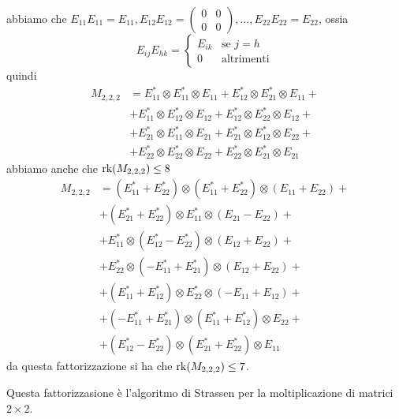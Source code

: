 \documentclass[../main.tex]{subfiles}
\begin{document}
abbiamo che $E_{11}E_{11} = E_{11}, E_{12}E_{12} = \begin{pmatrix}
        0 & 0 \\
        0 & 0
    \end{pmatrix}, \ldots, E_{22}E_{22} = E_{22}$, ossia
\begin{equation*}
    E_{ij} E_{hk} = \begin{cases}
        E_{ik} & \text{se } j = h  \\
        0      & \text{altrimenti}
    \end{cases}
\end{equation*}
quindi
\begin{align*}
    M_{2,2,2} & = E_{11}^* \otimes E_{11}^* \otimes E_{11} + E_{12}^* \otimes E_{21}^* \otimes E_{11} + \\
              & + E_{11}^* \otimes E_{12}^* \otimes E_{12} + E_{12}^* \otimes E_{22}^* \otimes E_{12} + \\
              & + E_{21}^* \otimes E_{11}^* \otimes E_{21} + E_{21}^* \otimes E_{12}^* \otimes E_{22} + \\
              & + E_{22}^* \otimes E_{22}^* \otimes E_{22} + E_{22}^* \otimes E_{21}^* \otimes E_{21}
\end{align*}
abbiamo anche che $\operatorname{rk}(M_{2,2,2}) \leq 8$
\begin{align*}
    M_{2,2,2} & = (E_{11}^* + E_{22}^*) \otimes (E_{11}^* + E_{22}^*) \otimes (E_{11} + E_{22}) + \\
              & + (E_{21}^* + E_{22}^*) \otimes E_{11}^* \otimes (E_{21} - E_{22}) +              \\
              & + E_{11}^* \otimes (E_{12}^* - E_{22}^*) \otimes (E_{12} + E_{22}) +              \\
              & + E_{22}^* \otimes (-E_{11}^* + E_{21}^*) \otimes (E_{12} + E_{22}) +             \\
              & + (E_{11}^* + E_{12}^*) \otimes E_{22}^* \otimes (-E_{11} + E_{12}) +             \\
              & + (-E_{11}^* + E_{21}^*) \otimes (E_{11}^* + E_{12}^*) \otimes E_{22} +           \\
              & + (E_{12}^* - E_{22}^*) \otimes (E_{21}^* + E_{22}^*) \otimes E_{11}
\end{align*}
da questa fattorizzazione si ha che $\operatorname{rk}(M_{2,2,2}) \leq 7$.

Questa fattorizzasione è l'algoritmo di Strassen per la moltiplicazione di matrici $2 \times 2$.
\end{document}
